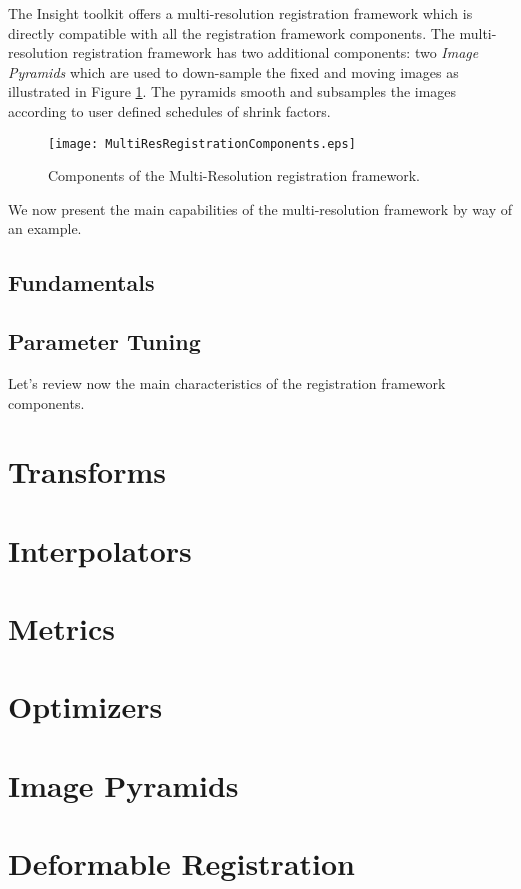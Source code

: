 The Insight toolkit offers a multi-resolution registration framework which
is directly compatible with all the registration framework components. The
multi-resolution registration framework has two additional components:
two \emph{Image Pyramids} which are used to down-sample the fixed and moving
images as illustrated in Figure \ref{fig:MultiResRegistrationComponents}.
The pyramids smooth and subsamples the images according to user defined
schedules of shrink factors. 
 
\begin{figure}
\center
\texttt{[image: MultiResRegistrationComponents.eps]}
\caption{Components of the Multi-Resolution registration framework.}
\label{fig:MultiResRegistrationComponents}
\end{figure}
 
We now present the main capabilities of the multi-resolution framework by
way of an example.

\subsection{Fundamentals}


\subsection{Parameter Tuning}


Let's review now the main characteristics of the registration framework components. 

\section{Transforms}
\label{sec:Transforms}


\section{Interpolators}
\label{sec:Interpolators}


\section{Metrics}
\label{sec:Metrics}


\section{Optimizers}
\label{sec:Optimizers}


\section{Image Pyramids}
\label{sec:ImagePyramids}



\section{Deformable Registration}
\label{sec:DeformableRegistration}


